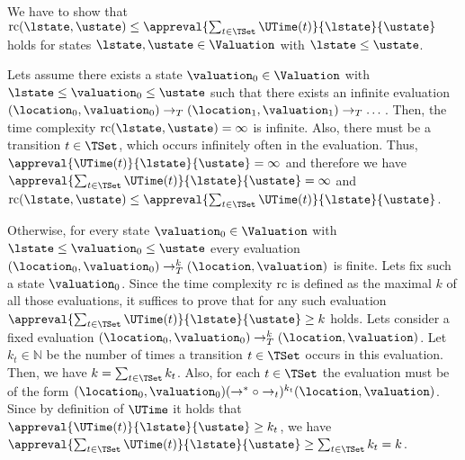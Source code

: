 We have to show that $\text{rc}(\lstate, \ustate) \leq \appreval{\sum_{t \in \TSet}\UTime(t)}{\lstate}{\ustate}$ holds for states $\lstate, \ustate \in \Valuation$ with $\lstate \leq \ustate$.

Lets assume there exists a state $\valuation_0 \in \Valuation$ with $\lstate \leq \valuation_0 \leq \ustate$ such that there exists an infinite evaluation $(\location_0, \valuation_0) \rightarrow_T (\location_1, \valuation_1) \rightarrow_T \dots$.
Then, the time complexity $\text{rc}(\lstate, \ustate) = \infty$ is infinite.
Also, there must be a transition $t \in \TSet$, which occurs infinitely often in the evaluation.
Thus, $\appreval{\UTime(t)}{\lstate}{\ustate} = \infty$ and therefore we have $\appreval{\sum_{t \in \TSet}\UTime(t)}{\lstate}{\ustate} = \infty$ and $\text{rc}(\lstate, \ustate) \leq \appreval{\sum_{t \in \TSet}\UTime(t)}{\lstate}{\ustate}$.

Otherwise, for every state $\valuation_0 \in \Valuation$ with $\lstate \leq \valuation_0 \leq \ustate$ every evaluation $(\location_0, \valuation_0) \rightarrow^k_T (\location, \valuation)$ is finite.
Lets fix such a state $\valuation_0$.
Since the time complexity $\text{rc}$ is defined as the maximal $k$ of all those evaluations, it suffices to prove that for any such evaluation $\appreval{\sum_{t \in \TSet}\UTime(t)}{\lstate}{\ustate} \geq k$ holds.
Lets consider a fixed evaluation $(\location_0, \valuation_0) \rightarrow^k_T (\location, \valuation)$.
Let $k_t \in \mathbb{N}$ be the number of times a transition $t \in \TSet$ occurs in this evaluation.
Then, we have $k = \sum_{t \in \TSet} k_t$.
Also, for each $t \in \TSet$ the evaluation must be of the form $(\location_0, \valuation_0) (\rightarrow^* \circ \rightarrow_t)^{k_t} (\location, \valuation)$.
Since by definition of $\UTime$ it holds that $\appreval{\UTime(t)}{\lstate}{\ustate} \geq k_t$, we have $\appreval{\sum_{t \in \TSet}\UTime(t)}{\lstate}{\ustate} \geq \sum_{t \in \TSet} k_t = k$.
